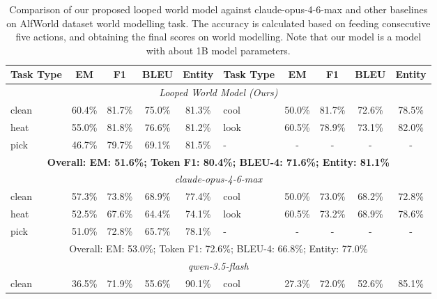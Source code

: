 \begin{table}[h]
\centering
    \setlength\tabcolsep{2.5pt}
    \setlength\extrarowheight{0pt}
\caption{Comparison of our proposed looped world model against claude-opus-4-6-max \citep{anthropic2026opus46} and other baselines on AlfWorld dataset \citep{cote2018textworld} world modelling task. The accuracy is calculated based on feeding consecutive five actions, and obtaining the final scores on world modelling. Note that our model is a model with about 1B model parameters.}
\label{tab:alfworldmain}
\begin{tabular}{lcccc|lcccc}
\toprule
\textbf{Task Type} & \textbf{EM} & \textbf{F1}
  & \textbf{BLEU} & \textbf{Entity} & \textbf{Task Type} & \textbf{EM} & \textbf{F1}
  & \textbf{BLEU} & \textbf{Entity} \\
\midrule
\multicolumn{10}{c}{\textit{Looped World Model (Ours)}}\\
\midrule
clean            &    60.4\%&      81.7\%&    75.0\%&      81.3\%&
cool             &    50.0\%&      81.7\%&    72.6\%&      78.5\%\\
heat             &    55.0\%&      81.8\%&    76.6\%&      81.2\%&
look             &    60.5\%&      78.9\%&    73.1\%&      82.0\%\\
pick            &    46.7\%&      79.7\%&    69.1\%&      81.5\%&
- & - & - & - & -\\
\midrule
\multicolumn{10}{c}{\textbf{Overall: EM: 51.6\%; Token F1: 80.4\%; BLEU-4: 71.6\%; Entity: 81.1\%}}\\
\midrule
\multicolumn{10}{c}{\textit{claude-opus-4-6-max}}\\
\midrule
clean            &    57.3\%&      73.8\%&    68.9\%&      77.4\%&
cool             &    50.0\%&      73.0\%&    68.2\%&      72.8\%\\
heat             &    52.5\%&      67.6\%&    64.4\%&      74.1\%&
look             &    60.5\%&      73.2\%&    68.9\%&      78.6\%\\
pick            &    51.0\%&      72.8\%&    65.7\%&      78.1\%&
- & - & - & - & -\\
\midrule
\multicolumn{10}{c}{Overall: EM: 53.0\%; Token F1: 72.6\%; BLEU-4: 66.8\%; Entity: 77.0\%}\\
\midrule
\multicolumn{10}{c}{\textit{qwen-3.5-flash \citep{qwen35blog}}}\\
\midrule
clean            &    36.5\%  &    71.9\% &   55.6\%&      90.1\%&
cool             &    27.3\%   &   72.0\%  &  52.6\%&      85.1\%\\

\end{tabular}
\end{table}
